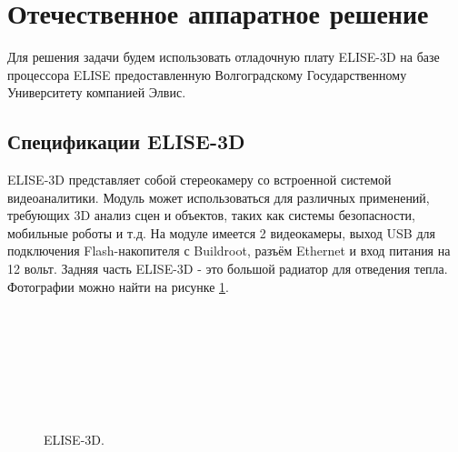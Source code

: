 \documentclass[14pt,a4paper]{scrartcl}
\begin{document}

\section{Отечественное аппаратное решение}

	Для  решения задачи будем использовать отладочную плату ELISE-3D на базе процессора ELISE предоставленную Волгоградскому Государственному Университету компанией Элвис.
	
	\subsection{Спецификации ELISE-3D}
	
		ELISE-3D представляет собой стереокамеру со встроенной системой видеоаналитики. Модуль может использоваться для различных применений, требующих 3D анализ сцен и объектов, таких как системы безопасности, мобильные роботы и т.д. На модуле имеется 2 видеокамеры, выход USB для подключения Flash-накопителя с Buildroot, разъём Ethernet и вход питания на 12 вольт. Задняя часть ELISE-3D - это большой радиатор для отведения тепла. Фотографии можно найти на рисунке \ref{fig:ELISE-3D}\cite{bib:Chuprikov_NIR}.
		
		\begin{figure}[H]
			\begin{minipage}[h]{0.47\linewidth}
				 \hspace{0.1cm} \\
			\end{minipage}
			\hfill
			\begin{minipage}[h]{0.47\linewidth}
				 \hspace{0.1cm} \\
			\end{minipage}
			\vfill
			\begin{minipage}[h]{0.47\linewidth}
				 \\
			\end{minipage}
			\hfill
			\begin{minipage}[h]{0.47\linewidth}
				 \\
			\end{minipage}
			\caption{ELISE-3D.}
			\label{fig:ELISE-3D}
		\end{figure}
	
\end{document}
